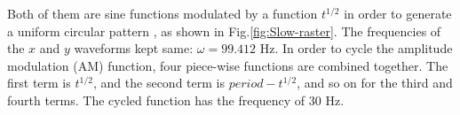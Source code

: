 \documentclass[english,review,number,sort&compress]{elsarticle}
\begin{document}
 Both of them are sine functions modulated by a function $t^{1/2}$ in order to generate a uniform circular pattern \citep{HCraster200501}, as shown in Fig.\ref{fig:Slow-raster}. The frequencies of the $x$ and $y$ waveforms kept same: $\omega=99.412$ Hz. In order to cycle the amplitude modulation (AM) function, four piece-wise functions are combined together. The first term is $t^{1/2}$, and the second term is $period-t^{1/2}$, and so on for the third and fourth terms. The cycled function has the frequency of 30 Hz. 
\begin{figure}[tbph]
\begin{centering}
\end{centering}
\end{figure}
\end{document}
